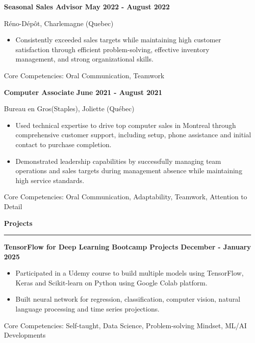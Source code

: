\documentclass[letterpaper,11pt]{article}
\begin{document}
\textbf{Seasonal Sales Advisor \hfill May 2022 - August 2022}
\par
\vspace{-15pt}
Réno-Dépôt, Charlemagne (Quebec)

\begin{itemize}
\setlength{\itemsep}{-3pt}
\item 
Consistently exceeded sales targets while maintaining high customer satisfaction through efficient problem-solving, effective inventory management, and strong organizational skills.
\end{itemize}

Core Competencies: Oral Communication, Teamwork
\vspace{-5pt}

\textbf{Computer Associate} \hfill \textbf{June 2021 - August 2021} 
\par
\vspace{-15pt}
Bureau en Gros(Staples), Joliette (Québec)

\begin{itemize}
\setlength{\itemsep}{-3pt}
\item
Used technical expertise to drive top computer sales in Montreal through comprehensive customer support, including setup, phone assistance and initial contact to purchase completion.
\item
Demonstrated leadership capabilities by successfully managing team operations and sales targets during management absence while maintaining high service standards.
\end{itemize}
Core Competencies: Oral Communication, Adaptability, Teamwork, Attention
to Detail
\vspace{-5pt}

\textbf{Projects}\par
\vspace{-20pt}
\rule{\textwidth}{0.4pt}

\textbf{TensorFlow for Deep Learning Bootcamp Projects \hfill December - January 2025}
\begin{itemize}
\setlength{\itemsep}{-3pt}
\item
Participated in a Udemy course to build multiple models using TensorFlow, Keras and Scikit-learn on Python using Google Colab platform.
\item
Built neural network for regression, classification, computer vision, natural language processing and time series projections.
\end{itemize}
Core Competencies: Self-taught, Data Science, Problem-solving Mindset, ML/AI Developments
\end{document}

